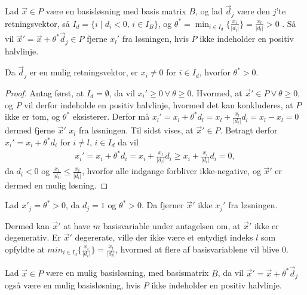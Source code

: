 \begin{lma}
Lad $\vec{x} \in P$ være en basisløsning med basis matrix $B$, og lad $\vec{d}_j$ være den $j$'te retningsvektor, så $I_d = \{i \mid d_i < 0, \, i  \in I_B\}$, og $\theta^* = \min_{i \in I_d}\{\frac{x_i}{|d_i|}\}=\frac{x_l}{|d_l|} > 0$ . 
Så vil $\vec{x}' = \vec{x}+ \theta^* \vec{d}_j \in P$ fjerne $x_l'$ fra løsningen, hvis $P$ ikke indeholder en positiv halvlinje.
\label{lma:skalar}
\end{lma}

\begin{bem}
Da $\vec{d}_j$ er en mulig retningsvektor, er $x_i\neq 0$ for $i \in I_d$, hvorfor $\theta^* > 0$.
\end{bem}

\begin{proof}
Antag først, at $I_d = \emptyset$, da vil $x_i' \geq 0 \ \forall \ \theta \geq 0$. 
Hvormed, at $\vec{x}' \in P \ \forall \ \theta \geq 0$, og $P$ vil derfor indeholde en positiv halvlinje, hvormed det kan konkluderes, at $P$ ikke er tom, og $\theta^*$ eksisterer.
Derfor må $x_l' = x_l + \theta^* d_l = x_l + \frac{x_l}{|d_l|}d_l = x_l - x_l = 0$ dermed fjerne $\vec{x}'$ $x_l$ fra løsningen.
Til sidst vises, at $\vec{x}' \in P$. Betragt derfor $x_i' = x_i + \theta^* d_i$ for $i \neq l$, $i \in I_d$ da vil
\begin{align*}
x_i' = x_i + \theta^* d_i = x_i + \frac{x_l}{|d_l|}d_i \geq x_i + \frac{x_i}{|d_i|}d_i = 0,
\end{align*}
da $d_i < 0$ og $\frac{x_l}{|d_l|} \leq \frac{x_i}{|d_i|}$, hvorfor alle indgange forbliver ikke-negative, og $\vec{x}'$ er dermed en mulig løsning.
\end{proof}

\begin{bem}
Lad $x'_j = \theta^* >  0$, da $d_j = 1$ og $\theta^* > 0$. Da fjerner $\vec{x}'$ ikke $x_j'$ fra løsningen.
\end{bem}

Dermed kan $\vec{x}'$ at have $m$ basisvariable under antagelsen om, at $\vec{x}'$ ikke er degenerativ. Er $\vec{x}'$ degererate, ville der ikke være et entydigt indeks $l$ som opfyldte at $min_{i \in I_d}\{\frac{x_i}{|d_i|}\}=\frac{x_l}{|d_l|}$, hvormed at flere af basisvariablene vil blive $0$. 

\begin{stn}
Lad $\vec{x}\in P$ være en mulig basisløsning, med basismatrix $B$, da vil $\vec{x}' = \vec{x}+ \theta^*\vec{d}_j$ også være en mulig basisløsning, hvis $P$ ikke indeholder en positiv halvlinje.
\end{stn}

